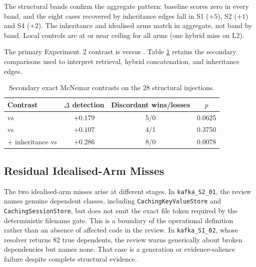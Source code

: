The structural bands confirm the aggregate pattern: baseline scores zero in
every band, and the eight cases recovered by inheritance edges fall in S1
($+5$), S2 ($+1$) and S4 ($+2$). The inheritance and idealised arms match
in aggregate, not band by band. Local controls are at or near ceiling for
all arms (one hybrid miss on L2).

The primary Experiment~2 contrast is \kg{} versus \baseline{}. Table
\ref{tab:exp2-secondary-contrasts} retains the secondary comparisons used to
interpret retrieval, hybrid concatenation, and inheritance edges.

\begin{table}[htbp]
    \centering
    \caption{Secondary exact McNemar contrasts on the 28 structural
             injections.}
    \label{tab:exp2-secondary-contrasts}
    \small
    \begin{tabular}{lccc}
        \toprule
        Contrast & $\Delta$ detection & Discordant wins/losses & $p$ \\
        \midrule
        \rag{} vs \baseline{} & $+0.179$ & 5/0 & 0.0625 \\
        \hybrid{} vs \kg{} & $+0.107$ & 4/1 & 0.3750 \\
        \kg{} + inheritance vs \kg{} & $+0.286$ & 8/0 & 0.0078 \\
        \bottomrule
    \end{tabular}
\end{table}

\subsection{Residual Idealised-Arm Misses}
\label{app:supporting-exp2-misses}

The two idealised-arm misses arise at different stages. In
\texttt{kafka\_S2\_01}, the review names genuine dependent classes, including
\texttt{CachingKeyValueStore} and \texttt{CachingSessionStore}, but does not
emit the exact file token required by the deterministic filename gate. This is
a boundary of the operational definition rather than an absence of affected
code in the review. In \texttt{kafka\_S1\_02}, whose resolver returns 82 true
dependents, the review warns generically about broken dependencies but names
none. That case is a generation or evidence-salience failure despite complete
structural evidence.

